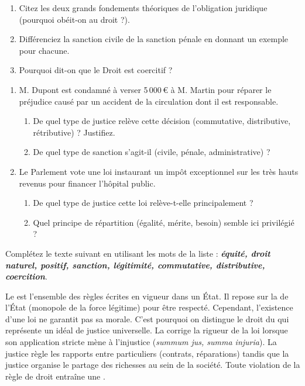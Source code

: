 \documentclass[11pt]{article}
\begin{document}
\begin{exercice}
\begin{enumerate}
    \item Citez les deux grands fondements théoriques de l'obligation juridique (pourquoi obéit-on au droit ?).
    \item Différenciez la sanction civile de la sanction pénale en donnant un exemple pour chacune.
    \item Pourquoi dit-on que le Droit est \og coercitif \fg{} ?
\end{enumerate}
\end{exercice}

\begin{exercice}
\begin{enumerate}
    \item M. Dupont est condamné à verser 5\,000\,€ à M. Martin pour réparer le préjudice causé par un accident de la circulation dont il est responsable.
    \begin{enumerate}
        \item De quel type de justice relève cette décision (commutative, distributive, rétributive) ? Justifiez.
        \item De quel type de sanction s'agit-il (civile, pénale, administrative) ?
    \end{enumerate}
    \item Le Parlement vote une loi instaurant un impôt exceptionnel sur les très hauts revenus pour financer l'hôpital public.
    \begin{enumerate}
        \item De quel type de justice cette loi relève-t-elle principalement ?
        \item Quel principe de répartition (égalité, mérite, besoin) semble ici privilégié ?
    \end{enumerate}
\end{enumerate}
\end{exercice}

\begin{exercice}
Complétez le texte suivant en utilisant les mots de la liste : \textit{\textbf{équité, droit naturel, positif, sanction, légitimité, commutative, distributive, coercition}}.

Le \dotfill{} est l'ensemble des règles écrites en vigueur dans un État. Il repose sur la \dotfill{} de l'État (monopole de la force légitime) pour être respecté. Cependant, l'existence d'une loi ne garantit pas sa \dotfill{} morale. C'est pourquoi on distingue le droit \dotfill{} du \dotfill{} qui représente un idéal de justice universelle. La \dotfill{} corrige la rigueur de la loi lorsque son application stricte mène à l'injustice (\textit{summum jus, summa injuria}). La justice \dotfill{} règle les rapports entre particuliers (contrats, réparations) tandis que la justice \dotfill{} organise le partage des richesses au sein de la société. Toute violation de la règle de droit entraîne une \dotfill{}.
\end{exercice}
\end{document}
